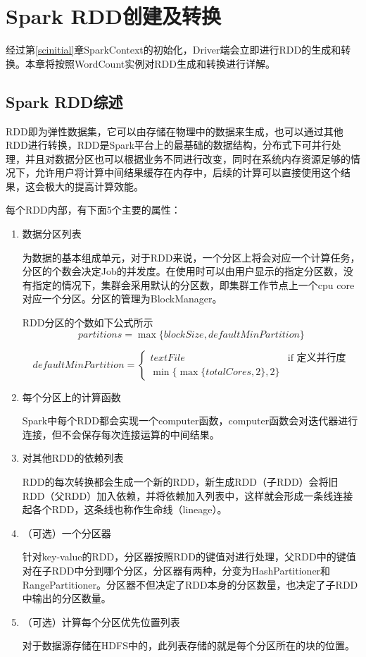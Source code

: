 \chapter{Spark RDD创建及转换}
\label{chap:rddcreate}
经过第\ref{scinitial}章SparkContext的初始化，Driver端会立即进行RDD的生成和转换。本章将按照WordCount实例对RDD生成和转换进行详解。
\section{Spark RDD综述}

RDD即为弹性数据集，它可以由存储在物理中的数据来生成，也可以通过其他RDD进行转换，RDD是Spark平台上的最基础的数据结构，分布式下可并行处理，并且对数据分区也可以根据业务不同进行改变，同时在系统内存资源足够的情况下，允许用户将计算中间结果缓存在内存中，后续的计算可以直接使用这个结果，这会极大的提高计算效能。

每个RDD内部，有下面5个主要的属性：

\begin{enumerate}[\bfseries 1]
	\item 数据分区列表
	
	为数据的基本组成单元，对于RDD来说，一个分区上将会对应一个计算任务，分区的个数会决定Job的并发度。在使用时可以由用户显示的指定分区数，没有指定的情况下，集群会采用默认的分区数，即集群工作节点上一个cpu core对应一个分区。分区的管理为BlockManager。
	
	RDD分区的个数如下公式所示
	\begin{equation}
		partitions = \max \{ blockSize, defaultMinPartition\}
	\end{equation}
    
    \begin{equation}
    defaultMinPartition=
    \begin{cases}
    textFile &\mbox{if 定义并行度}\\
    \min\{\max\{totalCores,2\},2\}
    \end{cases}
    \end{equation}
	\item 每个分区上的计算函数
	
	Spark中每个RDD都会实现一个computer函数，computer函数会对迭代器进行连接，但不会保存每次连接运算的中间结果。
	\item 对其他RDD的依赖列表
	
	RDD的每次转换都会生成一个新的RDD，新生成RDD（子RDD）会将旧RDD（父RDD）加入依赖，并将依赖加入列表中，这样就会形成一条线连接起各个RDD，这条线也称作生命线（lineage）。
	\item （可选）一个分区器
	
	针对key-value的RDD，分区器按照RDD的键值对进行处理，父RDD中的键值对在子RDD中分到哪个分区，分区器有两种，分变为HashPartitioner和RangePartitioner。分区器不但决定了RDD本身的分区数量，也决定了子RDD中输出的分区数量。
	\item （可选）计算每个分区优先位置列表
	
	对于数据源存储在HDFS中的，此列表存储的就是每个分区所在的块的位置。
\end{enumerate}
